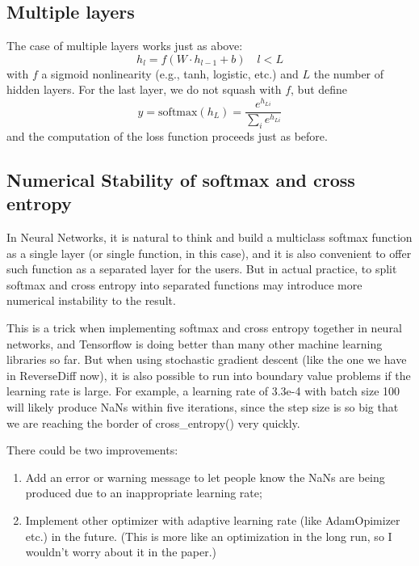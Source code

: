 \documentclass[10pt]{article}
\begin{document}
\subsection{Multiple layers}
The case of multiple layers works just as above:
\begin{equation}
    h_l = f(W \cdot h_{l-1} + b) \quad l < L
\end{equation}
with $f$ a sigmoid nonlinearity (e.g., tanh, logistic, etc.) and $L$ the number of hidden layers. For the last layer, we do not squash with $f$, but define
\begin{equation}
    y = \mathrm{softmax}(h_L) = \frac{e^{h_{Li}}}{\sum_i e^{h_{Li}}}
\end{equation}
and the computation of the loss function proceeds just as before.


\subsection{Numerical Stability of softmax and cross entropy}
In Neural Networks, it is natural to think and build a multiclass softmax function as a single layer (or single function, in this case), and it is also convenient to offer such function as a separated layer for the users. But in actual practice, to split softmax and cross entropy into separated functions may introduce more numerical instability to the result.

This is a trick when implementing softmax and cross entropy together in neural networks, and Tensorflow is doing better than many other machine learning libraries so far. But when using stochastic gradient descent (like the one we have in ReverseDiff now), it is also possible to run into boundary value problems if the learning rate is large. For example, a learning rate of 3.3e-4 with batch size 100 will likely produce NaNs within five iterations, since the step size is so big that we are reaching the border of cross\_entropy() very quickly.

There could be two improvements:
\begin{enumerate}
    \item Add an error or warning message to let people know the NaNs are being produced due to an inappropriate learning rate;
    \item Implement other optimizer with adaptive learning rate (like AdamOpimizer etc.) in the future. (This is more like an optimization in the long run, so I wouldn't worry about it in the paper.)
\end{enumerate}
\end{document}
